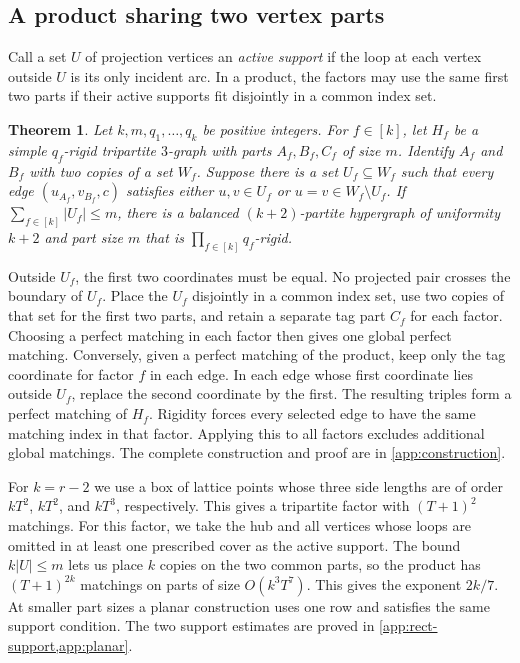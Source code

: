 \documentclass[10pt]{article}
\numberwithin{equation}{section}
\newtheorem{theorem}{Theorem}[section]
\theoremstyle{definition}
\begin{document}
\subsection{A product sharing two vertex parts}

Call a set $U$ of projection vertices an \emph{active support} if the loop at each vertex outside $U$ is its only incident arc. In a product, the factors may use the same first two parts if their active supports fit disjointly in a common index set.

\begin{theorem}\label{thm:support-product}
Let $k,m,q_1,\ldots,q_k$ be positive integers. For $f\in[k]$, let $H_f$ be a simple $q_f$-rigid tripartite $3$-graph with parts $A_f,B_f,C_f$ of size $m$. Identify $A_f$ and $B_f$ with two copies of a set $W_f$. Suppose there is a set $U_f\subseteq W_f$ such that every edge $(u_{A_f},v_{B_f},c)$ satisfies either $u,v\in U_f$ or $u=v\in W_f\setminus U_f$. If $\sum_{f\in[k]}|U_f|\le m$, there is a balanced $(k+2)$-partite hypergraph of uniformity $k+2$ and part size $m$ that is $\prod_{f\in[k]}q_f$-rigid.
\end{theorem}

Outside $U_f$, the first two coordinates must be equal. No projected pair crosses the boundary of $U_f$. Place the $U_f$ disjointly in a common index set, use two copies of that set for the first two parts, and retain a separate tag part $C_f$ for each factor. Choosing a perfect matching in each factor then gives one global perfect matching. Conversely, given a perfect matching of the product, keep only the tag coordinate for factor $f$ in each edge. In each edge whose first coordinate lies outside $U_f$, replace the second coordinate by the first. The resulting triples form a perfect matching of $H_f$. Rigidity forces every selected edge to have the same matching index in that factor. Applying this to all factors excludes additional global matchings. The complete construction and proof are in \cref{app:construction}.

For $k=r-2$ we use a box of lattice points whose three side lengths are of order $kT^2$, $kT^2$, and $kT^3$, respectively. This gives a tripartite factor with $(T+1)^2$ matchings. For this factor, we take the hub and all vertices whose loops are omitted in at least one prescribed cover as the active support. The bound $k|U|\le m$ lets us place $k$ copies on the two common parts, so the product has $(T+1)^{2k}$ matchings on parts of size $O(k^3T^7)$. This gives the exponent $2k/7$. At smaller part sizes a planar construction uses one row and satisfies the same support condition. The two support estimates are proved in \cref{app:rect-support,app:planar}.
\end{document}

